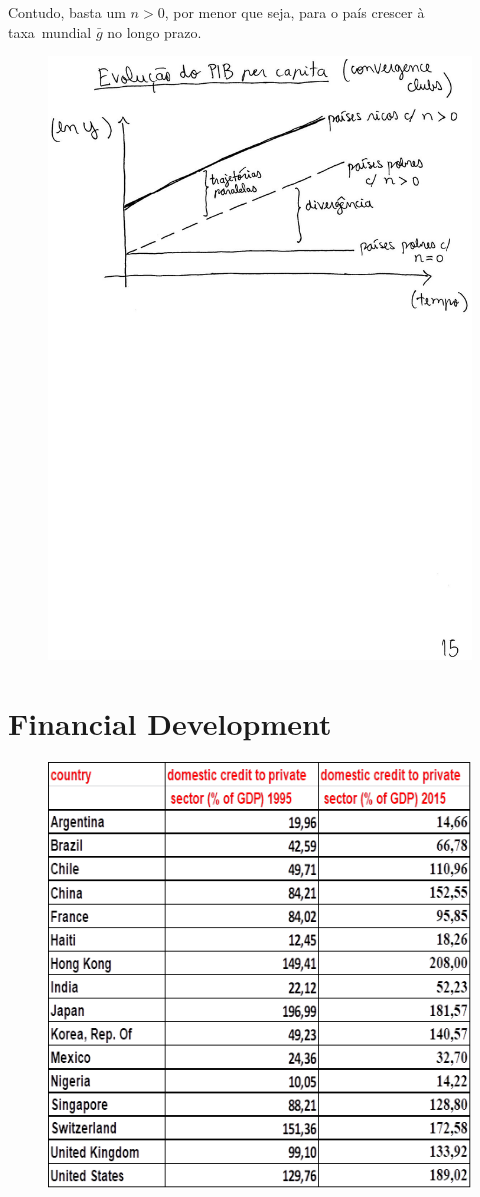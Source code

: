 \documentclass[a4paper,12pt]{article}[abntex2]
\begin{document}
\noindent Contudo, basta um $n>0$, por menor que seja, para o país crescer à taxa\ mundial $\bar{g}$ no longo prazo.

\begin{figure}[H]
    \centering
    \includegraphics[width=0.7\linewidth]{Imagens/a19i1.png}
\end{figure}

\newpage
\section{\textbf{Financial Development}}

\begin{figure}[H]
    \centering
    \includegraphics[width=0.7\linewidth]{Imagens/a20i1.png}
\end{figure}
\end{document}
